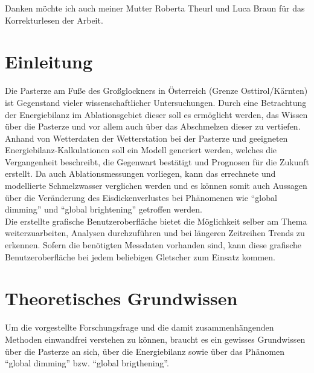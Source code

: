 \documentclass[11pt,a4paper]{article}
\begin{document}
Danken möchte ich auch meiner Mutter Roberta Theurl und Luca Braun für das Korrekturlesen der Arbeit. 


\pagebreak

\tableofcontents
\vspace{1cm}

\pagebreak
\listoffigures
\vspace{1cm}

\pagebreak
\listoftables
\vspace{1cm}


\pagebreak
{}  
\setcounter{page}{1}

\section{Einleitung}
Die Pasterze am Fuße des Großglockners in Österreich (Grenze Osttirol/Kärnten) ist Gegenstand vieler wissenschaftlicher Untersuchungen. Durch eine Betrachtung der Energiebilanz im Ablationsgebiet dieser soll es ermöglicht werden, das Wissen über die Pasterze und vor allem auch über das Abschmelzen dieser zu vertiefen. Anhand von Wetterdaten der Wetterstation bei der Pasterze und geeigneten Energiebilanz-Kalkulationen soll ein Modell generiert werden, welches die Vergangenheit beschreibt, die Gegenwart bestätigt und Prognosen für die Zukunft erstellt. Da auch Ablationsmessungen vorliegen, kann das errechnete und modellierte Schmelzwasser verglichen werden und es können somit auch Aussagen über die Veränderung des Eisdickenverlustes bei Phänomenen wie ``global dimming'' und ``global brightening'' getroffen werden. \\
Die erstellte grafische Benutzeroberfläche bietet die Möglichkeit selber am Thema weiterzuarbeiten, Analysen durchzuführen und bei längeren Zeitreihen Trends zu erkennen. Sofern die benötigten Messdaten vorhanden sind, kann diese grafische Benutzeroberfläche bei jedem beliebigen Gletscher zum Einsatz kommen.


\section{Theoretisches Grundwissen}
Um die vorgestellte Forschungsfrage und die damit zusammenhängenden Methoden einwandfrei verstehen zu können, braucht es ein gewisses Grundwissen über die Pasterze an sich, über die Energiebilanz sowie über das Phänomen ``global dimming'' bzw. ``global brigthening''.
\end{document}
